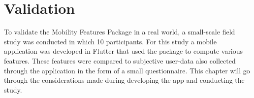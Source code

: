 \chapter{Validation}
\label{chapter:06}
To validate the Mobility Features Package in a real world, a small-scale field study was conducted in which 10 participants. For this study a mobile application was developed in Flutter that used the package to compute various features. These features were compared to subjective user-data also collected through the application in the form of a small questionnaire. This chapter will go through the considerations made during developing the app and conducting the study.



   
